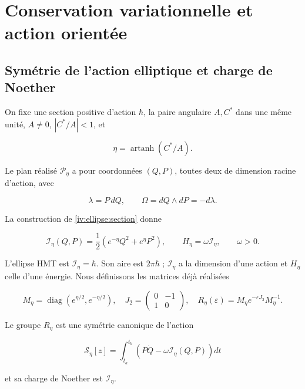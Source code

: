\section{Conservation variationnelle et action orientée}
\label{nuclear:7}
\subsection{Symétrie de l’action elliptique et charge de Noether}

On fixe une section positive d’action \(\hbar\), la paire angulaire \(A,C^*\) dans une même unité, \(A\ne0\), \(|C^*/A|<1\), et

\[
\eta=\operatorname{artanh}(C^*/A).
\]

Le plan réalisé \(\mathcal P_\eta\) a pour coordonnées \((Q,P)\), toutes deux de dimension racine d’action, avec


\[
\lambda=P\,dQ,\qquad \Omega=dQ\wedge dP=-d\lambda.
\]

La construction de \cref{iv:ellipse:section} donne

\begin{equation}
\mathcal I_\eta(Q,P)=\frac12(e^{-\eta}Q^2+e^\eta P^2),
\qquad H_\eta=\omega\mathcal I_\eta,\qquad \omega>0.
\label{nuc07:eq:1}
\end{equation}

L’ellipse HMT est \(\mathcal I_\eta=\hbar\). Son aire est \(2\pi\hbar\) ; \(\mathcal I_\eta\) a la dimension d’une action et \(H_\eta\) celle d’une énergie. Nous définissons les matrices déjà réalisées

\begin{equation}
M_\eta=\operatorname{diag}(e^{\eta/2},e^{-\eta/2}),\quad
J_2=\begin{pmatrix}0&-1\\1&0\end{pmatrix},\quad
R_\eta(\varepsilon)=M_\eta e^{-\varepsilon J_2}M_\eta^{-1}.
\label{nuc07:eq:2}
\end{equation}

\begin{proposition}
Le groupe \(R_\eta\) est une symétrie canonique de l’action

\begin{equation}
\mathscr S_\eta[z]=\int_{t_a}^{t_b}
\left(P\dot Q-\omega\mathcal I_\eta(Q,P)\right)dt
\label{nuc07:eq:3}
\end{equation}

et sa charge de Noether est \(\mathcal I_\eta\).

\end{proposition}

